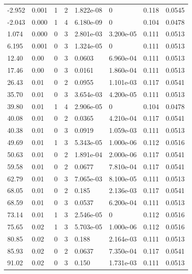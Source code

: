 \documentclass[preview]{standalone}
\begin{document}
{{\begin{tabular}{L{1.2cm}C{1.2cm} C{0.3cm}C{0.5cm} C{1.4cm}C{1.4cm} C{1.4cm}C{1.4cm}}
  -2.952  &  0.001  & 1     &  2 &  1.822e-08  & 0  & 0.118 &  0.0545   \\ 
  -2.043  &  0.000  & 1     &  4 &  6.180e-09  & 0  & 0.104 &  0.0478   \\ 
  1.074  &  0.000  & 0     &  3 &  2.801e-03  & 3.200e-05  & 0.111 &  0.0513   \\ 
  6.195  &  0.001  & 0     &  3 &  1.324e-05  & 0  & 0.111 &  0.0513   \\ 
  12.40  &  0.00  & 0     &  3 &  0.0603  & 6.960e-04  & 0.111 &  0.0513   \\ 
  17.46  &  0.00  & 0     &  3 &  0.0161  & 1.860e-04  & 0.111 &  0.0513   \\ 
  26.43  &  0.01  & 0     &  2 &  0.0955  & 1.101e-03  & 0.117 &  0.0541   \\ 
  35.70  &  0.01  & 0     &  3 &  3.654e-03  & 4.200e-05  & 0.111 &  0.0513   \\ 
  39.80  &  0.01  & 1     &  4 &  2.906e-05  & 0  & 0.104 &  0.0478   \\ 
  40.08  &  0.01  & 0     &  2 &  0.0365  & 4.210e-04  & 0.117 &  0.0541   \\ 
  40.38  &  0.01  & 0     &  3 &  0.0919  & 1.059e-03  & 0.111 &  0.0513   \\ 
  49.69  &  0.01  & 1     &  3 &  5.343e-05  & 1.000e-06  & 0.112 &  0.0516   \\ 
  50.63  &  0.01  & 0     &  2 &  1.891e-04  & 2.000e-06  & 0.117 &  0.0541   \\ 
  59.58  &  0.01  & 0     &  2 &  0.0677  & 7.810e-04  & 0.117 &  0.0541   \\ 
  62.79  &  0.01  & 0     &  3 &  7.065e-03  & 8.100e-05  & 0.111 &  0.0513   \\ 
  68.05  &  0.01  & 0     &  2 &  0.185  & 2.136e-03  & 0.117 &  0.0541   \\ 
  68.59  &  0.01  & 0     &  3 &  0.0537  & 6.200e-04  & 0.111 &  0.0513   \\ 
  73.14  &  0.01  & 1     &  3 &  2.546e-05  & 0  & 0.112 &  0.0516   \\ 
  75.65  &  0.02  & 1     &  3 &  5.703e-05  & 1.000e-06  & 0.112 &  0.0516   \\ 
  80.85  &  0.02  & 0     &  3 &  0.188  & 2.164e-03  & 0.111 &  0.0513   \\ 
  85.93  &  0.02  & 0     &  2 &  0.0637  & 7.350e-04  & 0.117 &  0.0541   \\ 
  91.02  &  0.02  & 0     &  3 &  0.150  & 1.731e-03  & 0.111 &  0.0513   \\ 

\end{tabular}}}
\end{document}
